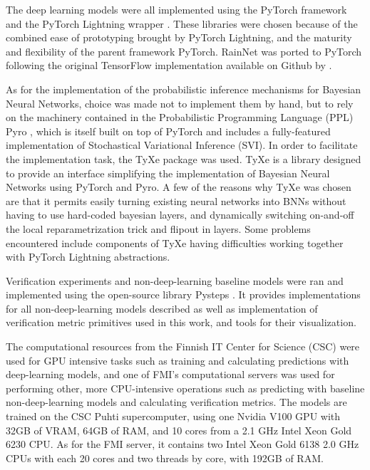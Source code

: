 The deep learning models were all implemented using the PyTorch framework and the PyTorch Lightning wrapper \cite{Falcon_PyTorch_Lightning_2019}. These libraries were chosen because of the combined ease of prototyping brought by PyTorch Lightning, and the maturity and flexibility of the parent framework PyTorch. RainNet was ported to PyTorch following the original TensorFlow \cite{abadi_tensorflow_2016} implementation available on Github by \citet{Ayzel2020RainNet}. 

As for the implementation of the probabilistic inference mechanisms for Bayesian Neural Networks, choice was made not to implement them by hand, but to rely on the machinery contained in the Probabilistic Programming Language (PPL) Pyro \cite{bingham2018pyro}, which is itself built on top of PyTorch and includes a fully-featured implementation of Stochastical Variational Inference (SVI). In order to facilitate the implementation task, the TyXe package \cite{ritter2021tyxe} was used. TyXe is a library designed to provide an interface simplifying the implementation of Bayesian Neural Networks using PyTorch and Pyro. A few of the reasons why TyXe was chosen are that it permits easily turning existing neural networks into BNNs without having to use hard-coded bayesian layers, and dynamically switching on-and-off the local reparametrization trick and flipout in layers. Some problems encountered include components of TyXe having difficulties working together with PyTorch Lightning abstractions.

Verification experiments and non-deep-learning baseline models were ran and implemented using the open-source library Pysteps \cite{pulkkinen_pysteps_2019}. It provides implementations for all non-deep-learning models described as well as implementation of verification metric primitives used in this work, and tools for their visualization. 

The computational resources from the Finnish IT Center for Science (CSC) were used for GPU intensive tasks such as training and calculating predictions with deep-learning models, and one of FMI's computational servers was used for performing other, more CPU-intensive operations such as predicting with baseline non-deep-learning models and calculating verification metrics. The models are trained on the CSC Puhti supercomputer, using one Nvidia V100 GPU with 32GB of VRAM, 64GB of RAM, and 10 cores from a 2.1 GHz Intel Xeon Gold 6230 CPU. As for the FMI server, it contains two Intel Xeon Gold 6138 2.0 GHz CPUs with each 20 cores and two threads by core, with 192GB of RAM. 

